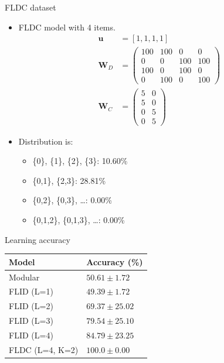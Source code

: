 \documentclass{beamer}
\begin{document}
\begin{frame}{FLDC dataset}
  \begin{itemize}
    \item FLDC model with 4 items.
    \begin{align*}
    \mathbf{u} &= [1,1,1,1] \\
    \mathbf{W}_{D} &= \left( \begin{array}{cccc}
    100 & 100 & 0 & 0 \\
    0 & 0 & 100 & 100 \\
    100 & 0 & 100 & 0 \\
    0 & 100 & 0 & 100 \end{array} \right) \\
    \mathbf{W}_{C} &= \left( \begin{array}{cc}
    5 & 0 \\
    5 & 0  \\
    0 & 5 \\
    0 & 5 \end{array} \right)
    \end{align*}
    \item Distribution is:
    \begin{itemize}
      \item \{0\}, \{1\}, \{2\}, \{3\}: 10.60\%
      \item \{0,1\}, \{2,3\}: 28.81\%
      \item \{0,2\}, \{0,3\}, \dots: 0.00\%
      \item \{0,1,2\}, \{0,1,3\}, \dots: 0.00\%
    \end{itemize}
  \end{itemize}
\end{frame}

\begin{frame}{Learning accuracy}
  \begin{table}
    \centering
    \begin{tabular}{@{}ll@{}}
      \hline
      \textbf{Model} & \textbf{Accuracy (\%)}\\
      \hline
      Modular & $50.61 \pm 1.72$ \\
      FLID (L=1) & $49.39 \pm 1.72$ \\
      FLID (L=2) & $69.37 \pm 25.02$ \\
      FLID (L=3) & $79.54 \pm 25.10$ \\
      FLID (L=4) & $84.79 \pm 23.25$ \\
      FLDC (L=4, K=2) & $100.0 \pm 0.00$ \\
      \hline
    \end{tabular}
  \end{table}
\end{frame}
\end{document}
